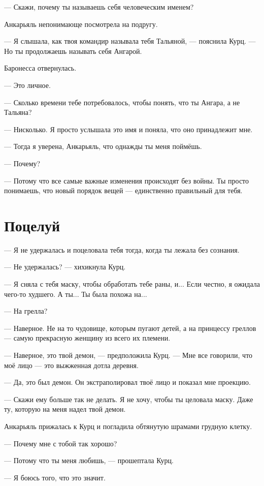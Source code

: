 \documentclass[a4paper,12pt,fleqn]{book}\usepackage{polyglossia}\setdefaultlanguage[babelshorthands=true]{russian}\setotherlanguage{english}\defaultfontfeatures{Ligatures=TeX,Mapping=tex-text}\usepackage{xcolor}\newcommand{\ml}[3]{#2}
\begin{document}
--- Скажи, почему ты называешь себя человеческим именем?

Анкарьяль непонимающе посмотрела на подругу.

--- Я слышала, как твоя командир называла тебя Тальяной, --- пояснила Курц.
--- Но ты продолжаешь называть себя Ангарой.

Баронесса отвернулась.

--- Это личное.

--- Сколько времени тебе потребовалось, чтобы понять, что ты Ангара, а не Тальяна?

--- Нисколько.
Я просто услышала это имя и поняла, что оно принадлежит мне.

--- Тогда я уверена, Анкарьяль, что однажды ты меня поймёшь.

--- Почему?

--- Потому что все самые важные изменения происходят без войны.
Ты просто понимаешь, что новый порядок вещей --- единственно правильный для тебя.

\section{Поцелуй}

--- Я не удержалась и поцеловала тебя тогда, когда ты лежала без сознания.

--- Не удержалась? --- хихикнула Курц.

--- Я сняла с тебя маску, чтобы обработать тебе раны, и...
Если честно, я ожидала чего-то худшего.
А ты...
Ты была похожа на...

--- На грелла?

--- Наверное.
Не на то чудовище, которым пугают детей, а на принцессу греллов --- самую прекрасную женщину из всего их племени.

--- Наверное, это твой демон, --- предположила Курц.
--- Мне все говорили, что моё лицо --- это выжженная дотла деревня.

--- Да, это был демон.
Он экстраполировал твоё лицо и показал мне проекцию.

--- Скажи ему больше так не делать.
Я не хочу, чтобы ты целовала маску.
Даже ту, которую на меня надел твой демон.

Анкарьяль прижалась к Курц и погладила обтянутую шрамами грудную клетку.

--- Почему мне с тобой так хорошо?

--- Потому что ты меня любишь, --- прошептала Курц.

--- Я боюсь того, что это значит.
\end{document}
